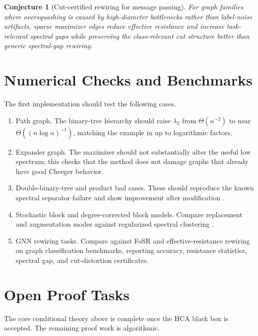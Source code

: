 \documentclass[11pt]{article}
\newtheorem{conjecture}[theorem]{Conjecture}
\begin{document}
\begin{conjecture}[Cut-certified rewiring for message passing]
For graph families where oversquashing is caused by high-diameter bottlenecks
rather than label-noise artifacts, sparse maximizer edges reduce effective
resistance and increase task-relevant spectral gaps while preserving the
class-relevant cut structure better than generic spectral-gap rewiring.
\end{conjecture}

\section{Numerical Checks and Benchmarks}

The first implementation should test the following cases.

\begin{enumerate}
\item Path graph.  The binary-tree hierarchy should raise $\lambda_2$ from
$\Theta(n^{-2})$ to near $\Theta((n\log n)^{-1})$, matching the example in
\cite{koutis2019spectral} up to logarithmic factors.
\item Expander graph.  The maximizer should not substantially alter the
useful low spectrum; this checks that the method does not damage graphs that
already have good Cheeger behavior.
\item Double-binary-tree and product bad cases.  These should reproduce the
known spectral separator failure and show improvement after modification
\cite{guattery1998quality,koutis2019spectral}.
\item Stochastic block and degree-corrected block models.  Compare replacement
and augmentation modes against regularized spectral clustering
\cite{zhang2018regularized}.
\item GNN rewiring tasks.  Compare against FoSR and effective-resistance
rewiring on graph classification benchmarks, reporting accuracy, resistance
statistics, spectral gap, and cut-distortion certificates.
\end{enumerate}

\section{Open Proof Tasks}

The core conditional theory above is complete once the HCA black box is
accepted.  The remaining proof work is algorithmic.
\end{document}
